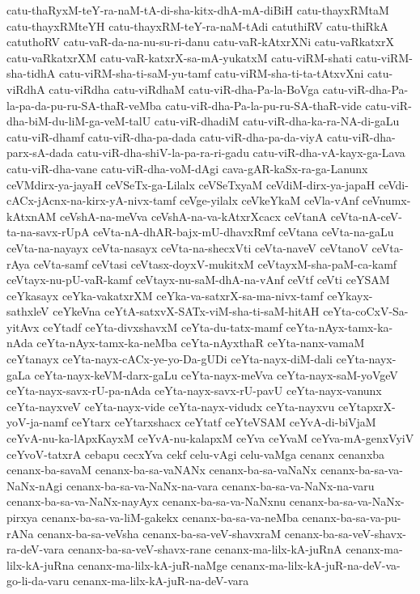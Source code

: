 {catu-thaRyxM-teY-ra-naM-tA-di-sha-kitx-dhA-mA-diBiH
catu-thayxRMtaM
catu-thayxRMteYH
catu-thayxRM-teY-ra-naM-tAdi
catuthiRV
catu-thiRkA
catuthoRV
catu-vaR-da-na-nu-su-ri-danu
catu-vaR-kAtxrXNi
catu-vaRkatxrX
catu-vaRkatxrXM
catu-vaR-katxrX-sa-mA-yukatxM
catu-viRM-shati
catu-viRM-sha-tidhA
catu-viRM-sha-ti-saM-yu-tamf
catu-viRM-sha-ti-ta-tAtxvXni
catu-viRdhA
catu-viRdha
catu-viRdhaM
catu-viR-dha-Pa-la-BoVga
catu-viR-dha-Pa-la-pa-da-pu-ru-SA-thaR-veMba
catu-viR-dha-Pa-la-pu-ru-SA-thaR-vide
catu-viR-dha-biM-du-liM-ga-veM-talU
catu-viR-dhadiM
catu-viR-dha-ka-ra-NA-di-gaLu
catu-viR-dhamf
catu-viR-dha-pa-dada
catu-viR-dha-pa-da-viyA
catu-viR-dha-parx-sA-dada
catu-viR-dha-shiV-la-pa-ra-ri-gadu
catu-viR-dha-vA-kayx-ga-Lava
catu-viR-dha-vane
catu-viR-dha-voM-dAgi
cava-gAR-kaSx-ra-ga-Lanunx
ceVMdirx-ya-jayaH
ceVSeTx-ga-Lilalx
ceVSeTxyaM
ceVdiM-dirx-ya-japaH
ceVdi-cACx-jAcnx-na-kirx-yA-nivx-tamf
ceVge-yilalx
ceVkeYkaM
ceVla-vAnf
ceVnumx-kAtxnAM
ceVshA-na-meVva
ceVshA-na-va-kAtxrXcacx
ceVtanA
ceVta-nA-ceV-ta-na-savx-rUpA
ceVta-nA-dhAR-bajx-mU-dhavxRmf
ceVtana
ceVta-na-gaLu
ceVta-na-nayayx
ceVta-nasayx
ceVta-na-shecxVti
ceVta-naveV
ceVtanoV
ceVta-rAya
ceVta-samf
ceVtasi
ceVtasx-doyxV-mukitxM
ceVtayxM-sha-paM-ca-kamf
ceVtayx-nu-pU-vaR-kamf
ceVtayx-nu-saM-dhA-na-vAnf
ceVtf
ceVti
ceYSAM
ceYkasayx
ceYka-vakatxrXM
ceYka-va-satxrX-sa-ma-nivx-tamf
ceYkayx-sathxleV
ceYkeVna
ceYtA-satxvX-SATx-viM-sha-ti-saM-hitAH
ceYta-coCxV-Sa-yitAvx
ceYtadf
ceYta-divxshavxM
ceYta-du-tatx-mamf
ceYta-nAyx-tamx-ka-nAda
ceYta-nAyx-tamx-ka-neMba
ceYta-nAyxthaR
ceYta-nanx-vamaM
ceYtanayx
ceYta-nayx-cACx-ye-yo-Da-gUDi
ceYta-nayx-diM-dali
ceYta-nayx-gaLa
ceYta-nayx-keVM-darx-gaLu
ceYta-nayx-meVva
ceYta-nayx-saM-yoVgeV
ceYta-nayx-savx-rU-pa-nAda
ceYta-nayx-savx-rU-pavU
ceYta-nayx-vanunx
ceYta-nayxveV
ceYta-nayx-vide
ceYta-nayx-vidudx
ceYta-nayxvu
ceYtapxrX-yoV-ja-namf
ceYtarx
ceYtarxshacx
ceYtatf
ceYteVSAM
ceYvA-di-biVjaM
ceYvA-nu-ka-lApxKayxM
ceYvA-nu-kalapxM
ceYva
ceYvaM
ceYva-mA-genxVyiV
ceYvoV-tatxrA
cebapu
cecxYva
cekf
celu-vAgi
celu-vaMga
cenanx
cenanxba
cenanx-ba-savaM
cenanx-ba-sa-vaNANx
cenanx-ba-sa-vaNaNx
cenanx-ba-sa-va-NaNx-nAgi
cenanx-ba-sa-va-NaNx-na-vara
cenanx-ba-sa-va-NaNx-na-varu
cenanx-ba-sa-va-NaNx-nayAyx
cenanx-ba-sa-va-NaNxnu
cenanx-ba-sa-va-NaNx-pirxya
cenanx-ba-sa-va-liM-gakekx
cenanx-ba-sa-va-neMba
cenanx-ba-sa-va-pu-rANa
cenanx-ba-sa-veVsha
cenanx-ba-sa-veV-shavxraM
cenanx-ba-sa-veV-shavx-ra-deV-vara
cenanx-ba-sa-veV-shavx-rane
cenanx-ma-lilx-kA-juRnA
cenanx-ma-lilx-kA-juRna
cenanx-ma-lilx-kA-juR-naMge
cenanx-ma-lilx-kA-juR-na-deV-va-go-li-da-varu
cenanx-ma-lilx-kA-juR-na-deV-vara
}
